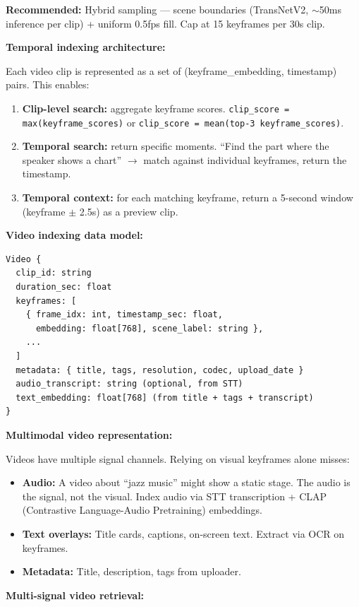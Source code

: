 \textbf{Recommended:} Hybrid sampling --- scene boundaries (TransNetV2, $\sim$50ms inference per clip) + uniform 0.5fps fill. Cap at 15 keyframes per 30s clip.

\textbf{Temporal indexing architecture:}

Each video clip is represented as a set of (keyframe\_embedding, timestamp) pairs. This enables:

\begin{enumerate}
  \item \textbf{Clip-level search:} aggregate keyframe scores. \texttt{clip\_score = max(keyframe\_scores)} or \texttt{clip\_score = mean(top-3 keyframe\_scores)}.
  \item \textbf{Temporal search:} return specific moments. ``Find the part where the speaker shows a chart'' $\rightarrow$ match against individual keyframes, return the timestamp.
  \item \textbf{Temporal context:} for each matching keyframe, return a 5-second window (keyframe $\pm$ 2.5s) as a preview clip.
\end{enumerate}

\textbf{Video indexing data model:}

\begin{verbatim}
Video {
  clip_id: string
  duration_sec: float
  keyframes: [
    { frame_idx: int, timestamp_sec: float,
      embedding: float[768], scene_label: string },
    ...
  ]
  metadata: { title, tags, resolution, codec, upload_date }
  audio_transcript: string (optional, from STT)
  text_embedding: float[768] (from title + tags + transcript)
}
\end{verbatim}

\textbf{Multimodal video representation:}

Videos have multiple signal channels. Relying on visual keyframes alone misses:
\begin{itemize}
  \item \textbf{Audio:} A video about ``jazz music'' might show a static stage. The audio is the signal, not the visual. Index audio via STT transcription + CLAP (Contrastive Language-Audio Pretraining) embeddings.
  \item \textbf{Text overlays:} Title cards, captions, on-screen text. Extract via OCR on keyframes.
  \item \textbf{Metadata:} Title, description, tags from uploader.
\end{itemize}

\textbf{Multi-signal video retrieval:}

